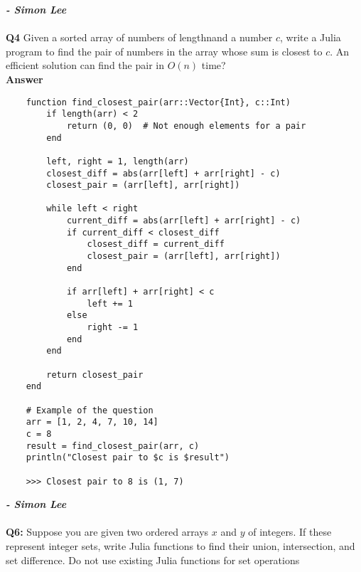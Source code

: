 \documentclass[8pt]{article}
\begin{document}
\textbf{\textit{- Simon Lee }} \\\\

\textbf{Q4} Given a sorted array of numbers of lengthnand a number $c$, write a Julia program to find the pair of numbers in the array whose sum is closest to $c$. An efficient solution can find the pair in $O(n)$ time?\\

\textbf{Answer}

\begin{verbatim}
    function find_closest_pair(arr::Vector{Int}, c::Int)
        if length(arr) < 2
            return (0, 0)  # Not enough elements for a pair
        end
        
        left, right = 1, length(arr)
        closest_diff = abs(arr[left] + arr[right] - c)
        closest_pair = (arr[left], arr[right])
        
        while left < right
            current_diff = abs(arr[left] + arr[right] - c)
            if current_diff < closest_diff
                closest_diff = current_diff
                closest_pair = (arr[left], arr[right])
            end
            
            if arr[left] + arr[right] < c
                left += 1
            else
                right -= 1
            end
        end
        
        return closest_pair
    end
    
    # Example of the question
    arr = [1, 2, 4, 7, 10, 14]
    c = 8
    result = find_closest_pair(arr, c)
    println("Closest pair to $c is $result")

    >>> Closest pair to 8 is (1, 7)
\end{verbatim}

\textbf{\textit{- Simon Lee }} \\\\

\textbf{Q6:} Suppose you are given two ordered arrays $x$ and $y$ of integers. If these represent integer sets, write Julia functions to find their union, intersection, and set difference. Do not use existing Julia functions for set operations 
\end{document}
